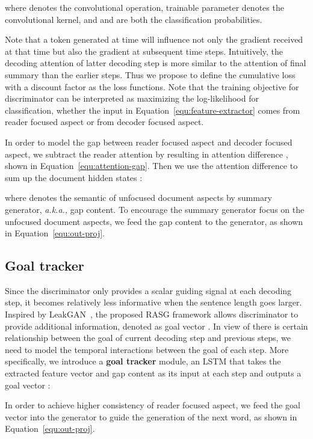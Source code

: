 \documentclass[letterpaper]{article} \usepackage{aaai19}  \usepackage{times}  \usepackage{helvet}  \usepackage{courier}
\newcommand{\aka}{\emph{a.k.a.,}\xspace}
\begin{document}
where  denotes the convolutional operation, trainable parameter  denotes the convolutional kernel, and  and  are both the classification probabilities.

Note that a token generated at time  will influence not only the gradient received at that time but also the gradient at subsequent time steps.
Intuitively, the decoding attention  of latter decoding step is more similar to the attention of final summary than the earlier steps.
Thus we propose to define the cumulative loss with a discount factor  as the loss functions.
Note that the training objective for discriminator can be interpreted as maximizing the log-likelihood for classification, whether the input  in Equation~\ref{equ:feature-extractor} comes from reader focused aspect or from decoder focused aspect. 


In order to model the gap between reader focused aspect and decoder focused aspect, we subtract the reader attention  by  resulting in attention difference , shown in Equation~\ref{equ:attention-gap}.
Then we use the attention difference  to sum up the document hidden states :

where  denotes the semantic of unfocused document aspects by summary generator, \aka gap content.
To encourage the summary generator focus on the unfocused document aspects, we feed the gap content  to the generator, as shown in Equation~\ref{equ:out-proj}.

\subsection{Goal tracker} \label{sec:goal-tracker}

Since the discriminator only provides a scalar guiding signal  at each decoding step, it becomes relatively less informative when the sentence length  goes larger. 
Inspired by LeakGAN~\cite{Guo2018LongTG}, the proposed RASG framework allows discriminator to provide additional information, denoted as goal vector .
In view of there is certain relationship between the goal of current decoding step and previous steps, we need to model the temporal interactions between the goal of each step.
More specifically, we introduce a \textbf{goal tracker} module, an LSTM that takes the extracted feature vector  and gap content  as its input at each step  and outputs a goal vector :

In order to achieve higher consistency of reader focused aspect, we feed the goal vector  into the generator to guide the generation of the next word, as shown in Equation~\ref{equ:out-proj}.
\end{document}
